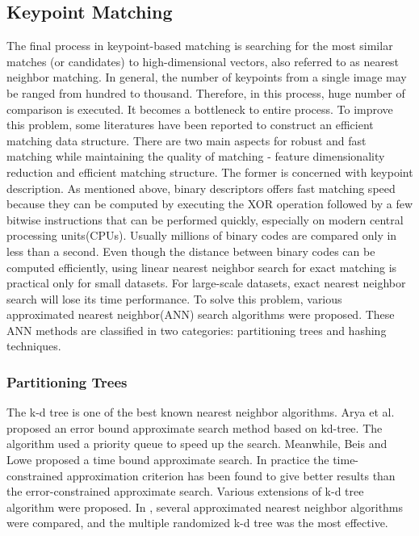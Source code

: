 \subsection{Keypoint Matching}
The final process in keypoint-based matching is searching for the most similar matches (or candidates) to high-dimensional vectors, also referred to as nearest neighbor matching. In general, the number of keypoints from a single image may be ranged from hundred to thousand. Therefore, in this process, huge number of comparison is executed. It becomes a bottleneck to entire process. To improve this problem, some literatures have been reported to construct an efficient matching data structure. There are two main aspects for robust and fast matching while maintaining the quality of matching - feature dimensionality reduction and efficient matching structure. The former is concerned with keypoint description. As mentioned above, binary descriptors offers fast matching speed because they can be computed by executing the XOR operation followed by a few bitwise instructions that can be performed quickly, especially on modern central processing units(CPUs). Usually millions of binary codes are compared only in less than a second\cite{ma_fast_2014}. Even though the distance between binary codes can be computed efficiently, using linear nearest neighbor search for exact matching is practical only for small datasets. For large-scale datasets, exact nearest neighbor search will lose its time performance. To solve this problem, various approximated nearest neighbor(ANN) search algorithms were proposed. These ANN methods are classified in two categories: partitioning trees and hashing techniques\cite{muja_scalable_2014}.


\subsubsection{Partitioning Trees}
The k-d tree\cite{bentley_multidimensional_1975,friedman_algorithm_1977} is one of the best known nearest neighbor algorithms. Arya et al.\cite{arya_optimal_1998} proposed an error bound approximate search method based on kd-tree. The algorithm used a priority queue to speed up the search. Meanwhile, Beis and Lowe\cite{beis_shape_1997} proposed a time bound approximate search. In practice the time-constrained approximation criterion has been found to give better results than the error-constrained approximate search. Various extensions of k-d tree algorithm were proposed\cite{silpa-anan_optimised_2008,sproull_refinements_1991,dasgupta_random_2008,jia_optimizing_2010}. In \cite{muja_fast_2009}, several approximated nearest neighbor algorithms were compared, and the multiple randomized k-d tree was the most effective.

